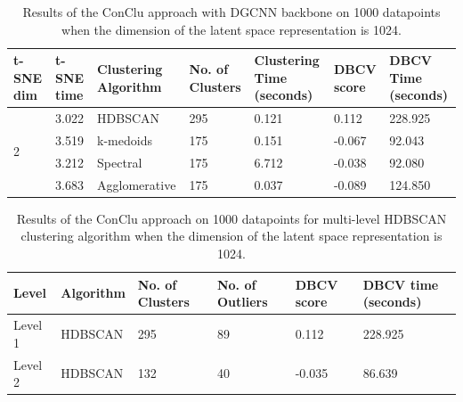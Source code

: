 \begin{table}[H]
  \setlength\extrarowheight{10pt}
  \caption{Results of the ConClu approach with \ac{DGCNN} backbone on 1000 datapoints when the dimension of the latent space representation is 1024. }
  \centering
  \begin{tabular}{|p{30pt}|p{50pt}|p{60pt}|p{50pt}|p{50pt}|p{50pt}|p{40pt}|}
    \toprule
    \ac{t-SNE} dim	& \ac{t-SNE} time & Clustering Algorithm & No. of Clusters & Clustering Time (seconds) & \ac{DBCV} score & \ac{DBCV} Time (seconds)\\
    \midrule
    \multirow{4}{30pt}{2}	& 3.022	& \ac{HDBSCAN}	& 295	& 0.121 & 0.112	& 228.925 \\ \cline{2-7} 
    & 3.519 & k-medoids	& 175	& 0.151 & -0.067	& 92.043 \\ \cline{2-7} 
    & 3.212 & Spectral	& 175	& 6.712 & -0.038 	& 92.080 \\ \cline{2-7}
    & 3.683 & Agglomerative	& 175	& 0.037 & -0.089	& 124.850 \\ 
    \bottomrule
  \end{tabular}
  \label{tab:dgcnn_1024}
\end{table}

\begin{table}[H]
  \setlength\extrarowheight{10pt}
  \caption{Results of the ConClu approach on 1000 datapoints for multi-level \ac{HDBSCAN} clustering algorithm when the dimension of the latent space representation is 1024. }
  \centering
  \begin{tabular}{|l|l|l|l|l|l|}
    \toprule
    Level & Algorithm	& No. of Clusters	& No. of Outliers	& DBCV score	& \ac{DBCV} time (seconds)	\\  
    \midrule
    Level 1 & \ac{HDBSCAN} & 295	& 89	& 0.112	& 228.925  \\ \cline{1-6}
    Level 2 & \ac{HDBSCAN} & 132	& 40	& -0.035	& 86.639 \\ 
    \bottomrule
  \end{tabular}
  \label{tab:dgcnn_1024_levels}
\end{table}

